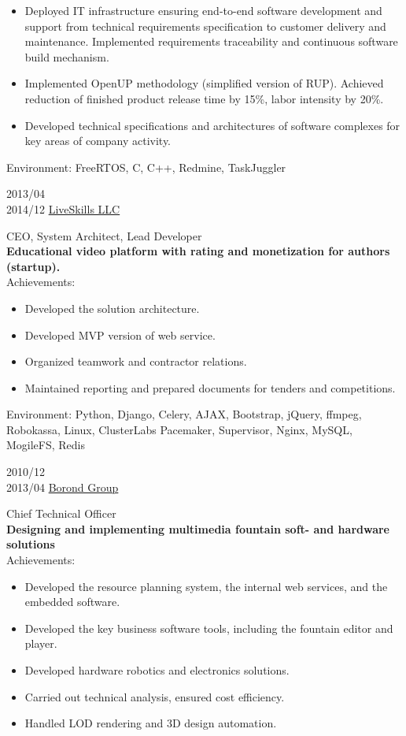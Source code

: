 \begin{entrylist}
{\begin{itemize}
\item Deployed IT infrastructure ensuring end-to-end software development and support from technical requirements specification to customer delivery and maintenance. Implemented requirements traceability and continuous software build mechanism.
\item Implemented OpenUP methodology (simplified version of RUP). Achieved reduction of finished product release time by 15\%, labor intensity by 20\%.
\item Developed technical specifications and architectures of software complexes for key areas of company activity.
\end{itemize}
Environment: FreeRTOS, C, C++, Redmine, TaskJuggler}
\entry
{2013/04\\2014/12}
{\href{}{LiveSkills LLC}}
{}
{CEO, System Architect, Lead Developer\\
\textbf{Educational video platform with rating and monetization for authors (startup).}\\
Achievements:
\begin{itemize}
\item Developed the solution architecture.
\item Developed MVP version of web service.
\item Organized teamwork and contractor relations.
\item Maintained reporting and prepared documents for tenders and competitions.
\end{itemize}
Environment: Python, Django, Celery, AJAX, Bootstrap, jQuery, ffmpeg, Robokassa, Linux, ClusterLabs Pacemaker, Supervisor, Nginx, MySQL, MogileFS, Redis}
\entry
{2010/12\\2013/04}
{\href{https://fontany.ru}{Borond Group}}
{}
{Chief Technical Officer\\
\textbf{Designing and implementing multimedia fountain soft- and hardware solutions}\\
Achievements:
\begin{itemize}
\item Developed the resource planning system, the internal web services, and the embedded software.
\item Developed the key business software tools, including the fountain editor and player.
\item Developed hardware robotics and electronics solutions.
\item Carried out technical analysis, ensured cost efficiency.
\item Handled LOD rendering and 3D design automation.

\end{itemize}}
\end{entrylist}
